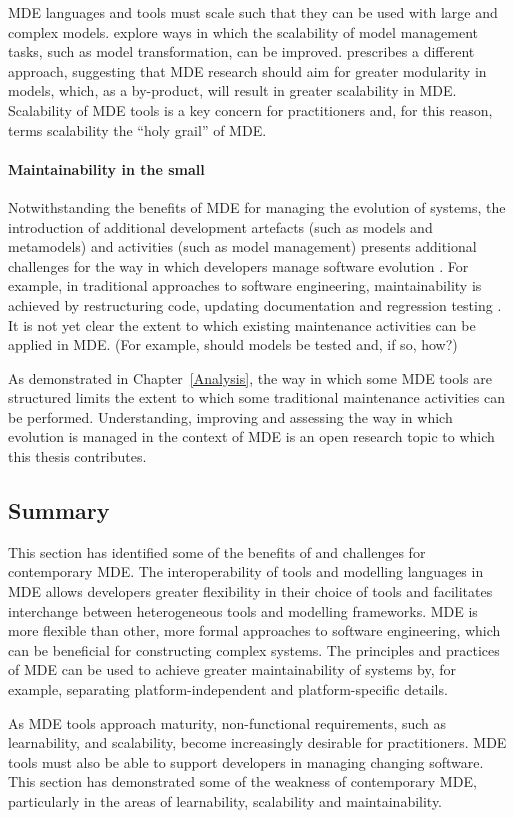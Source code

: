 MDE languages and tools must scale such that they can be used with large and complex models. \cite{hearnden06incremental,rath08live,tratt08change} explore ways in which the scalability of model management tasks, such as model transformation, can be improved. \cite{kolovos08scalability} prescribes a different approach, suggesting that MDE research should aim for greater modularity in models, which, as a by-product, will result in greater scalability in MDE. Scalability of MDE tools is a key concern for practitioners and, for this reason, \cite{kolovos08scalability} terms scalability the ``holy grail'' of MDE.

\paragraph{Maintainability in the small} Notwithstanding the benefits of MDE for managing the evolution of systems, the introduction of additional development artefacts (such as models and metamodels) and activities (such as model management) presents additional challenges for the way in which developers manage software evolution \cite{Mens07}. For example, in traditional approaches to software engineering, maintainability is achieved by restructuring code, updating documentation and regression testing \cite{feathers04working}. It is not yet clear the extent to which existing maintenance activities can be applied in MDE. (For example, should models be tested and, if so, how?)

As demonstrated in Chapter~\ref{Analysis}, the way in which some MDE tools are structured limits the extent to which some traditional maintenance activities can be performed. Understanding, improving and assessing the way in which evolution is managed in the context of MDE is an open research topic to which this thesis contributes. 

\subsection{Summary}
This section has identified some of the benefits of and challenges for contemporary MDE. The interoperability of tools and modelling languages in MDE allows developers greater flexibility in their choice of tools and facilitates interchange between heterogeneous tools and modelling frameworks. MDE is more flexible than other, more formal approaches to software engineering, which can be beneficial for constructing complex systems. The principles and practices of MDE can be used to achieve greater maintainability of systems by, for example, separating platform-independent and platform-specific details.

As MDE tools approach maturity, non-functional requirements, such as learnability, and scalability, become increasingly desirable for practitioners. MDE tools must also be able to support developers in managing changing software. This section has demonstrated some of the weakness of contemporary MDE, particularly in the areas of learnability, scalability and maintainability.
